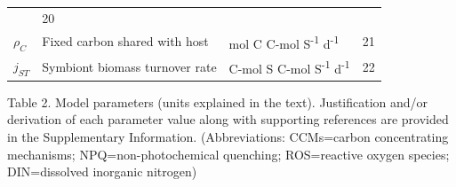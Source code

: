 \documentclass[]{elsarticle} %
\begin{document}
\begin{longtable}[]{@{}llll@{}}
\begin{minipage}[t]{0.26\columnwidth}
\end{minipage} & \begin{minipage}[t]{0.09\columnwidth}\raggedright\strut
20\strut
\end{minipage}\tabularnewline
\begin{minipage}[t]{0.09\columnwidth}\raggedright\strut
\(\rho_C\)\strut
\end{minipage} & \begin{minipage}[t]{0.44\columnwidth}\raggedright\strut
Fixed carbon shared with host\strut
\end{minipage} & \begin{minipage}[t]{0.26\columnwidth}\raggedright\strut
mol C C-mol S\textsuperscript{-1} d\textsuperscript{-1}\strut
\end{minipage} & \begin{minipage}[t]{0.09\columnwidth}\raggedright\strut
21\strut
\end{minipage}\tabularnewline
\begin{minipage}[t]{0.09\columnwidth}\raggedright\strut
\(j_{ST}\)\strut
\end{minipage} & \begin{minipage}[t]{0.44\columnwidth}\raggedright\strut
Symbiont biomass turnover rate\strut
\end{minipage} & \begin{minipage}[t]{0.26\columnwidth}\raggedright\strut
C-mol S C-mol S\textsuperscript{-1} d\textsuperscript{-1}\strut
\end{minipage} & \begin{minipage}[t]{0.09\columnwidth}\raggedright\strut
22\strut
\end{minipage}\tabularnewline
\bottomrule
\end{longtable}

Table 2. Model parameters (units explained in the text). Justification
and/or derivation of each parameter value along with supporting
references are provided in the Supplementary Information.
(Abbreviations: CCMs=carbon concentrating mechanisms;
NPQ=non-photochemical quenching; ROS=reactive oxygen species;
DIN=dissolved inorganic nitrogen)
\end{document}
